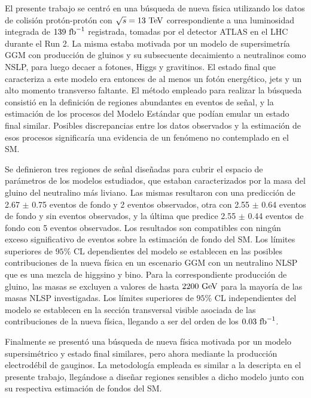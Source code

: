 El presente trabajo se centró en una búsqueda de nueva física utilizando los datos de colisión protón-protón con $\sqrt{s}=13\ \text{TeV}$ correspondiente a una luminosidad integrada de $139\ \text{fb}^{-1}$ registrada, tomadas por el detector ATLAS en el LHC durante el Run 2. La misma estaba motivada por un modelo de supersimetría GGM con producción de gluinos y su subsecuente decaimiento a neutralinos como NSLP, para luego decaer a fotones, Higgs y gravitinos. El estado final que caracteriza a este modelo era entonces de al menos un fotón energético, jets y un alto momento transverso faltante. El método empleado para realizar la búsqueda consistió en la definición de regiones abundantes en eventos de señal, y la estimación de los procesos del Modelo Estándar que podían emular un estado final similar. Posibles discrepancias entre los datos observados y la estimación de esos procesos significaría una evidencia de un fenómeno no contemplado en el SM. 

Se definieron tres regiones de señal diseñadas para cubrir el espacio de parámetros de los modelos estudiados, que estaban caracterizados por la masa del gluino del neutralino más liviano. Las mismas resultaron con una predicción de 2.67 $\pm$ 0.75 eventos de fondo y 2 eventos observados, otra con 2.55 $\pm$ 0.64 eventos de fondo y sin eventos observados, y la última que predice 2.55 $\pm$ 0.44 eventos de fondo con 5 eventos observados.
Los resultados son compatibles con ningún exceso significativo de eventos sobre la estimación de fondo del SM. Los límites superiores de $95\%$ CL dependientes del modelo se establecen en las posibles contribuciones de la nueva física en un escenario GGM con un neutralino NLSP que es una mezcla de higgsino y bino. Para la correspondiente producción de gluino, las masas se excluyen a valores de hasta $2200\ \text{GeV}$ para la mayoría de las masas NLSP investigadas. Los límites superiores de $95\%$ CL independientes del modelo se establecen en la sección transversal visible asociada de las contribuciones de la nueva física, llegando a ser del orden de los $0.03\ \text{fb}^{-1}$. 

Finalmente se presentó una búsqueda de nueva física motivada por un modelo supersimétrico y estado final similares, pero ahora mediante la producción electrodébil de gauginos. La metodología empleada es similar a la descripta en el presente trabajo, llegándose a diseñar regiones sensibles a dicho modelo junto con su respectiva estimación de fondos del SM. 
